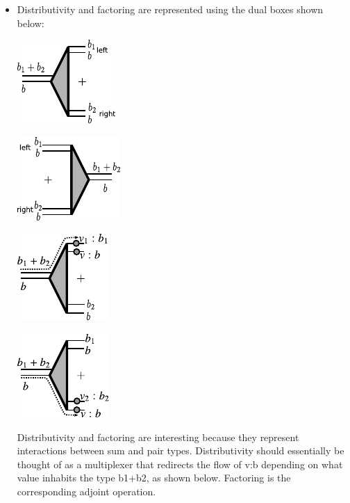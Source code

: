 \documentclass{llncs}
\begin{document}
\begin{itemize}
\item Distributivity and factoring are represented using the dual
  boxes shown below:
\begin{multicols}{4}
\begin{center}
  \includegraphics{diagrams/thesis/dist.pdf}
\end{center}
\begin{center}
  \includegraphics{diagrams/thesis/factor.pdf}
\end{center}
\begin{center}
  \includegraphics{diagrams/thesis/dist-wire-value1.pdf}
\end{center}
\begin{center}
  \includegraphics{diagrams/thesis/dist-wire-value2.pdf}
\end{center}
\end{multicols}

Distributivity and factoring are interesting because they represent
interactions between sum and pair types. Distributivity should
essentially be thought of as a multiplexer that redirects the flow of
{{v:b}} depending on what value inhabits the type {{b1+b2}}, as shown
below. Factoring is the corresponding adjoint operation.



\end{itemize}
\end{document}
